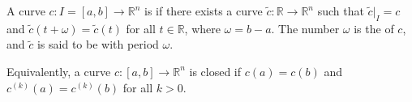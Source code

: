 A curve $c: I = [a, b] \to \mathbb{R}^n$ is  if there exists a curve $\tilde{c}: \mathbb{R} \to \mathbb{R}^n$ such that $\tilde{c}|_I = c$ and $\tilde{c}(t + \omega) = \tilde{c}(t)$ for all $t \in \mathbb{R}$, where $\omega = b - a$. The number $\omega$ is the  of $c$, and $\tilde{c}$ is said to be  with period $\omega$.

Equivalently, a curve $c: [a, b] \to \mathbb{R}^n$ is closed if $c(a) = c(b)$ and $c^{(k)}(a) = c^{(k)}(b)$ for all $k > 0$.
